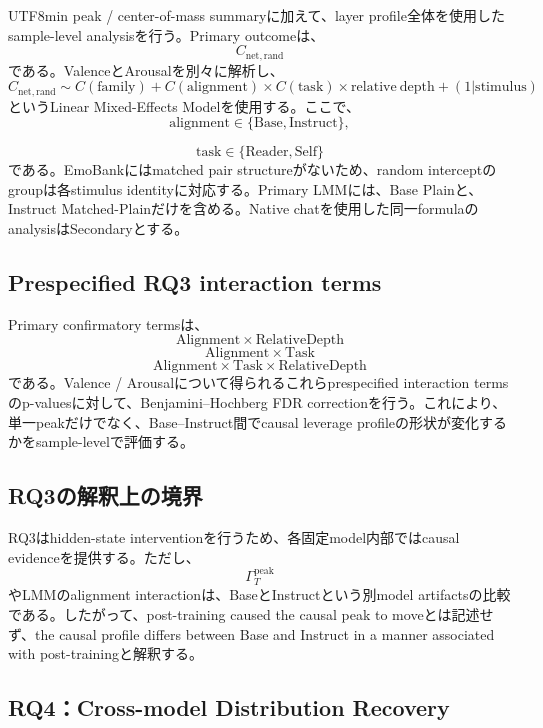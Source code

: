 \documentclass{article} %
\begin{document}
\begin{CJK*}{UTF8}{min}
peak / center-of-mass summaryに加えて、layer profile全体を使用したsample-level analysisを行う。Primary outcomeは、
\[
C_{\mathrm{net,rand}}
\]
である。ValenceとArousalを別々に解析し、
\[
C_{\mathrm{net,rand}}
\sim
C(\mathrm{family})
+
C(\mathrm{alignment})
\times
C(\mathrm{task})
\times
\mathrm{relative\ depth}
+
(1|\mathrm{stimulus})
\]
というLinear Mixed-Effects Modelを使用する。ここで、
\[
\mathrm{alignment}
\in
\{
\text{Base},
\text{Instruct}
\},
\]

\[
\mathrm{task}
\in
\{
\text{Reader},
\text{Self}
\}
\]
である。EmoBankにはmatched pair structureがないため、random interceptのgroupは各stimulus identityに対応する。Primary LMMには、Base Plainと、Instruct Matched-Plainだけを含める。Native chatを使用した同一formulaのanalysisはSecondaryとする。


\subsection{Prespecified RQ3 interaction terms}

Primary confirmatory termsは、
\[
\mathrm{Alignment}
\times
\mathrm{RelativeDepth}
\]
\[
\mathrm{Alignment}
\times
\mathrm{Task}
\]
\[
\mathrm{Alignment}
\times
\mathrm{Task}
\times
\mathrm{RelativeDepth}
\]
である。Valence / Arousalについて得られるこれらprespecified interaction termsのp-valuesに対して、Benjamini--Hochberg FDR correctionを行う。これにより、単一peakだけでなく、Base--Instruct間でcausal leverage profileの形状が変化するかをsample-levelで評価する。


\subsection{RQ3の解釈上の境界}

RQ3はhidden-state interventionを行うため、各固定model内部ではcausal evidenceを提供する。ただし、
\[
\Gamma_T^{\mathrm{peak}}
\]
やLMMのalignment interactionは、BaseとInstructという別model artifactsの比較である。したがって、post-training caused the causal peak to moveとは記述せず、the causal profile differs between Base and Instruct in a manner associated with post-trainingと解釈する。



\subsection{RQ4：Cross-model Distribution Recovery}
\label{app:v2-rq4}


\end{CJK*}
\end{document}
